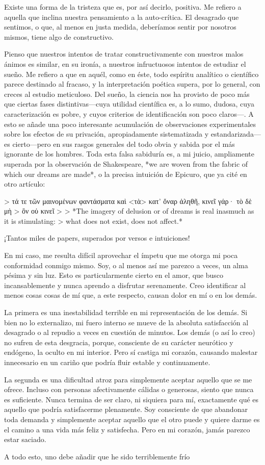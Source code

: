 \documentclass[a4paper, 12pt]{article}
\begin{document}
Existe una forma de la tristeza que es, por así decirlo, positiva. Me refiero a
aquella que inclina nuestra pensamiento a la auto-crítica.
El desagrado que sentimos, o que, al menos en justa medida, deberíamos
sentir por nosotros mismos, tiene algo de constructivo.

Pienso que nuestros intentos de tratar constructivamente con nuestros malos
ánimos es similar, en su ironía, a nuestros infructuosos intentos de estudiar
el sueño. Me refiero a que en aquél, como en éste, todo espíritu analítico o
científico parece destinado al fracaso, y la interpretación poética supera, por
lo general, con creces al estudio meticuloso. Del sueño, la ciencia nos ha
provisto de poco más que ciertas fases distintivas—cuya utilidad científica
es, a lo sumo, dudosa, cuya caracterización es pobre, y cuyos criterios de
identificación son poco claros—. A esto se añade una poco interesante
acumulación de observaciones experimentales sobre los efectos de su privación,
apropiadamente sistematizada y estandarizada—es cierto—pero en sus rasgos
generales del todo obvia y sabida por el más ignorante de los hombres.
Toda esta falsa sabiduría es, a mi juicio, ampliamente superada por la 
observación de Shakespeare, *we are woven from the fabric of which our dreams
are made*, o la precisa intuición de Epicuro, que ya cité en otro artículo:


> τά τε τῶν μαινομένων φαντάσματα καὶ <τὰ> κατ' ὄναρ ἀληθῆ, κινεῖ γάρ· τὸ δὲ μὴ
> ὂν οὐ κινεῖ 
> 
> *The imagery of delusion or of dreams is real inasmuch as it is stimulating:
> what does not exist, does not affect.*

¡Tantos miles de papers, superados por versos e intuiciones!

En mi caso, me resulta difícil aprovechar el ímpetu que me otorga mi poca
conformidad conmigo mismo. Soy, o al menos así me parezco a veces, un alma
pésima y sin luz. Esto es particularmente cierto en el amor, que busco
incansablemente y nunca aprendo a disfrutar serenamente. Creo identificar al
menos cosas cosas de mí que, a este respecto, causan dolor en mí o en los
demás.

La primera es una inestabilidad terrible en mi representación de los demás. Si
bien no lo externalizo, mi fuero interno se mueve de la absoluta satisfacción
al desagrado o al repudio a veces en cuestión de minutos. Los demás (o así lo creo) 
no sufren de esta desgracia, porque, consciente de su carácter neurótico y endógeno,
la oculto en mi interior. Pero sí castiga mi corazón, causando malestar
innecesario en un cariño que podría fluir estable y continuamente.

La segunda es una dificultad atroz para simplemente aceptar aquello que se me
ofrece. Incluso con personas afectivamente cálidas o generosas, siento que
nunca es suficiente. Nunca termina de ser claro, ni siquiera para mí,
exactamente qué es aquello que podría satisfacerme plenamente. Soy consciente
de que abandonar toda demanda y simplemente aceptar aquello que el otro puede y
quiere darme es el camino a una vida más feliz y satisfecha. Pero en mi
corazón, jamás parezco estar saciado.

A todo esto, uno debe añadir que he sido terriblemente frío
\end{document}
